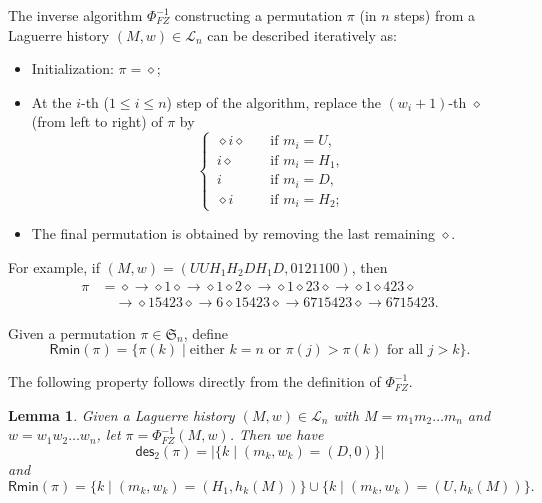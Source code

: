 \documentclass[12pt]{article}
\numberwithin{equation}{section}
\theoremstyle{plain}
\newtheorem{lemma}[theorem]{Lemma}
\def\des{\mathsf{des}}
\def\L{\mathcal{L}}
\def\Rmin{\mathsf{Rmin}}
\begin{document}
      The inverse algorithm $\Phi_{FZ}^{-1}$ constructing a permutation $\pi$ (in $n$ steps) from a Laguerre history $(M,w)\in\L_{n}$ can be described iteratively as:
      \begin{itemize}
      	\item Initialization: $\pi=\diamond$;
      	\item At the $i$-th ($1\leq i\leq n$) step of the algorithm, replace the $(w_i+1)$-th $\diamond$ (from left to right) of $\pi$ by
      	$$
      	\begin{cases}
      		\,\diamond i\diamond&\quad \text{if $m_i=U$},\\
      		\, i\diamond&\quad \text{if $m_i=H_1$},\\
      		\, i& \quad\text{if $m_i=D$},\\
      		\, \diamond i&\quad \text{if $m_i=H_2$};
      	\end{cases}
      	$$
      	\item The final permutation is obtained by removing  the last remaining $\diamond$.
      \end{itemize}
      
      For example,  if $(M, w)=(UUH_1H_2DH_1D,  0121100)$, then \begin{align*}
      	\pi&=\diamond\rightarrow \diamond1\diamond\rightarrow\diamond1\diamond2\diamond\rightarrow\diamond1\diamond23\diamond \rightarrow  \diamond1\diamond423\diamond\\
      	&\quad\rightarrow \diamond15423\diamond\rightarrow 6\diamond15423\diamond\rightarrow
  6715423\diamond\rightarrow 6715423.
      \end{align*}
      
      Given a permutation $\pi\in \mathfrak{S}_n$, define $$\Rmin(\pi)=\{\pi(k)\mid  \mbox{either $k=n$ or}\,\,  \pi(j)>\pi(k) \,\, \mbox{for all $j>k$}\}.$$ 
       
      The following property  follows directly from the definition of   $\Phi^{-1}_{FZ}$. 
      \begin{lemma}\label{lem-PhiFZ}
      Given a  Laguerre history $(M,w)\in\L_{n}$ with $M=m_1m_2\ldots m_n$ and $w=w_1w_2\ldots w_n$, let  $\pi=\Phi^{-1}_{FZ}(M,w)$. Then  we have
      	\begin{equation}\label{eq-des_2-Mot}
      	 \des_2(\pi)=|\{k\mid (m_k, w_k)=(D, 0)\}| 
      	 \end{equation}
      	and 
      	\begin{equation}\label{eq-Rec-Mot}
     \Rmin(\pi)=
      	\{k\mid (m_k, w_k)=(H_1, h_k(M))\}\cup \{k\mid (m_k, w_k)=(U, h_k(M))\}.
      	\end{equation}
      	\end{lemma}
      	 
\end{document}
